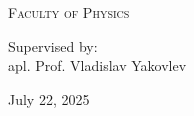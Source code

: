 \begin{titlepage}
    \vfill
    \vspace{0.5cm}
    \textsc{Faculty of Physics}
    
    \vspace{0.6cm}
    \vspace{0.3cm}


    Supervised by: \\apl. Prof. Vladislav Yakovlev %

    \vfill
    \vspace{0.9cm}
    
    {\Large July 22, 2025}
    
\end{titlepage}